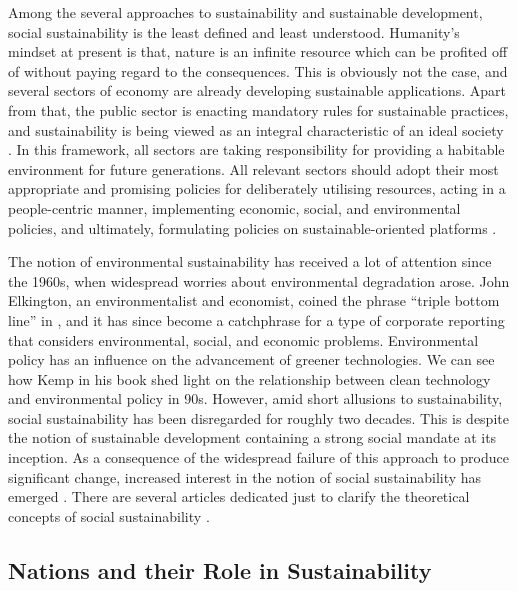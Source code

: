 \documentclass{infor}
\theoremstyle{remark}
\begin{document}
Among the several approaches to sustainability and sustainable development, social sustainability is the least defined and least understood. Humanity’s mindset at present is that, nature is an infinite resource which can be profited off of without paying regard to the consequences. This is obviously not the case, and several sectors of economy are already developing sustainable applications. Apart from that, the public sector is enacting mandatory rules for sustainable practices, and sustainability is being viewed as an integral characteristic of an ideal society \citep{vassallo2021sustainability, chowdhury2021review, swann2021linking}. In this framework, all sectors are taking responsibility for providing a habitable environment for future generations. All relevant sectors should adopt their most appropriate and promising policies for deliberately utilising resources, acting in a people-centric manner, implementing economic, social, and environmental policies, and ultimately, formulating policies on sustainable-oriented platforms \citep{weber2021environmental, tzouramani2020assessing, maynard2020environmental, van2020inclusive}.

The notion of environmental sustainability has received a lot of attention since the 1960s, when widespread worries about environmental degradation arose. John Elkington, an environmentalist and economist, coined the phrase “triple bottom line” in \cite{elkington1997triple}, and it has since become a catchphrase for a type of corporate reporting that considers environmental, social, and economic problems. Environmental policy has an influence on the advancement of greener technologies. We can see how Kemp in his book \cite{kemp1997environmental} shed light on the relationship between clean technology and environmental policy in 90s. However, amid short allusions to sustainability, social sustainability has been disregarded for roughly two decades. This is despite the notion of sustainable development containing a strong social mandate at its inception. As a consequence of the widespread failure of this approach to produce significant change, increased interest in the notion of social sustainability has emerged \citep{vallance2011social}. There are several articles dedicated just to clarify the theoretical concepts of social sustainability \citep{dempsey2011social, eizenberg2017social, mckenzie2004social, magis2010community, polese2000social}.

\subsection{Nations and their Role in Sustainability}
\end{document}
